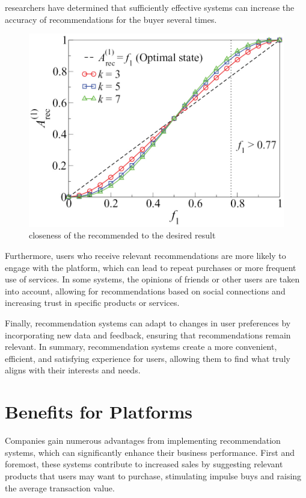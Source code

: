 \documentclass[10pt,twoside,slovak,a4paper]{article}
\begin{document}
researchers have determined that
sufficiently effective systems can increase the accuracy of recommendations for the buyer several times.
\begin{figure}[!h]
    \centering
    \includegraphics[width=0.9\linewidth]{picture.jpg}
    \caption{closeness of the recommended to the desired result}
    \label{fig:closeness}
\end{figure}

Furthermore, users who receive relevant recommendations are more likely to engage with the platform, which can lead to repeat purchases or more frequent use of services. In some systems, the opinions of friends or other users are taken into account, allowing for recommendations based on social connections and increasing trust in specific products or services.

Finally, recommendation systems can adapt to changes in user preferences by incorporating new data and feedback, ensuring that recommendations remain relevant. In summary, recommendation systems create a more convenient, efficient, and satisfying experience for users, allowing them to find what truly aligns with their interests and needs.




\section{Benefits for Platforms} \label{Benefits for Platforms}
Companies gain numerous advantages from implementing recommendation systems\cite{comerce}, which can significantly enhance their business performance. First and foremost, these systems contribute to increased sales by suggesting relevant products that users may want to purchase, stimulating impulse buys and raising the average transaction value.
\end{document}
